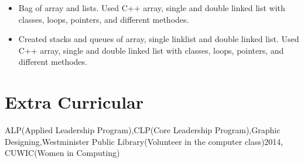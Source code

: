 \documentclass[10pt,a4paper,sans]{moderncv} %
\begin{document}
\begin{itemize}
\vspace{-5mm}
\item{Bag of array and lists. Used C++ array, single and double linked list with classes, loops, pointers, and different methodes.}
\end{itemize}
\begin{itemize}
\vspace{-5mm}
\item{Created stacks and queues of array, single linklist and double linked list. Used C++ array, single and double linked list with classes, loops, pointers, and different methodes.}
\end{itemize}
\vspace{-2mm}
\section{Extra Curricular}
ALP(Applied Leadership Program),CLP(Core Leadership Program),Graphic Designing,Westminister Public Library(Volunteer in the computer class)2014, CUWIC(Women in Computing)


\end{document}
